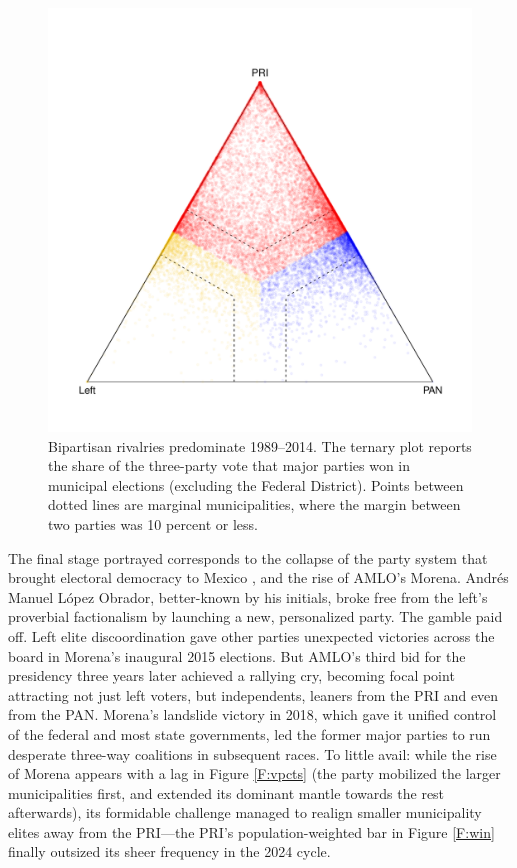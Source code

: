 \documentclass[letter,12pt]{article}
\begin{document}
\begin{figure}
  \centering
  \includegraphics[width=.6\columnwidth]{../../plots/triplot1989-2014-v-mu.pdf}
  \caption{Bipartisan rivalries predominate 1989--2014. The ternary plot reports the share of the three-party vote that major parties won in municipal elections (excluding the Federal District). Points between dotted lines are marginal municipalities, where the margin between two parties was 10 percent or less.}\label{F:triplot}
\end{figure}

The final stage portrayed corresponds to the collapse of the party system that brought electoral democracy to Mexico \citep{estevez.magar.rosas.2008,moreno.decisElec.2009}, and the rise of AMLO's Morena. Andrés Manuel López Obrador, better-known by his initials, broke free from the left's proverbial factionalism \citep{bruhn.1997} by launching a new, personalized party. The gamble paid off. Left elite discoordination gave other parties unexpected victories across the board in Morena's inaugural 2015 elections. But AMLO's third bid for the presidency three years later achieved a rallying cry, becoming focal point attracting not just left voters, but independents, leaners from the PRI and even from the PAN. Morena's landslide victory in 2018, which gave it unified control of the federal and most state governments, led the former major parties to run desperate three-way coalitions in subsequent races. To little avail: while the rise of Morena appears with a lag in Figure \ref{F:vpcts} (the party mobilized the larger municipalities first, and extended its dominant mantle towards the rest afterwards), its formidable challenge managed to realign smaller municipality elites away from the PRI---the PRI's population-weighted bar in Figure \ref{F:win} finally outsized its sheer frequency in the 2024 cycle.
\end{document}
